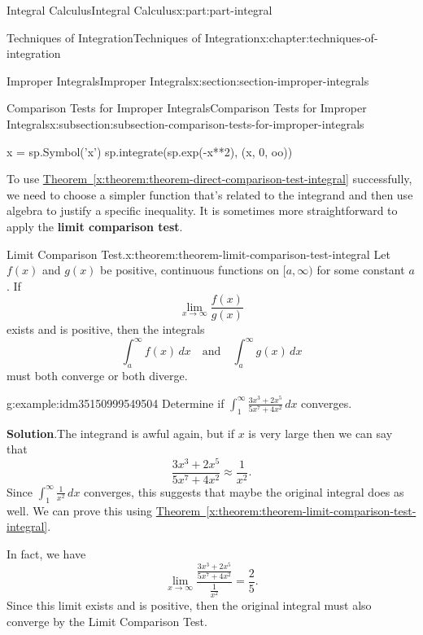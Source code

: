 \documentclass[twoside,10pt,]{tufte-book}
\newcommand{\blocktitlefont}{\relax}
\newcommand{\xreffont}{\relax}
\newcommand{\terminology}[1]{\textbf{#1}}
\numberwithin{equation}{part}
\begin{document}
\begin{partptx}{Integral Calculus}{}{Integral Calculus}{}{}{x:part:part-integral}
\begin{chapterptx}{Techniques of Integration}{}{Techniques of Integration}{}{}{x:chapter:techniques-of-integration}
\begin{sectionptx}{Improper Integrals}{}{Improper Integrals}{}{}{x:section:section-improper-integrals}
\begin{subsectionptx}{Comparison Tests for Improper Integrals}{}{Comparison Tests for Improper Integrals}{}{}{x:subsection:subsection-comparison-tests-for-improper-integrals}
\begin{sageinput}
x = sp.Symbol('x')
sp.integrate(sp.exp(-x**2), (x, 0, oo))
\end{sageinput}
To use \hyperref[x:theorem:theorem-direct-comparison-test-integral]{Theorem~{\xreffont\ref{x:theorem:theorem-direct-comparison-test-integral}}} successfully, we need to choose a simpler function that's related to the integrand and then use algebra to justify a specific inequality. It is sometimes more straightforward to apply the \terminology{limit comparison test}.%
\begin{theorem}{Limit Comparison Test.}{}{x:theorem:theorem-limit-comparison-test-integral}%
%
Let \(f(x)\) and \(g(x)\) be positive, continuous functions on \([a,\infty)\) for some constant \(a\). If%
\begin{equation*}
\lim_{x\to\infty}\frac{f(x)}{g(x)}
\end{equation*}
exists and is positive, then the integrals%
\begin{equation*}
\int_{a}^{\infty}f(x)\,dx\quad\text{and}\quad\int_{a}^{\infty}g(x)\,dx
\end{equation*}
must both converge or both diverge.%
\end{theorem}
\begin{example}{}{g:example:idm35150999549504}%
Determine if \(\displaystyle\int_{1}^{\infty}\frac{3x^{3} + 2x^{5}}{5x^{7} + 4x^{2}}\,dx\) converges.%
\par\smallskip%
\noindent\textbf{\blocktitlefont Solution}.\hypertarget{g:solution:idm35150999548608}{}\quad{}The integrand is awful again, but if \(x\) is very large then we can say that%
\begin{equation*}
\frac{3x^{3} + 2x^{5}}{5x^{7} + 4x^{2}} \approx \frac{1}{x^{2}}.
\end{equation*}
Since \(\int_{1}^{\infty}\frac{1}{x^{2}}\,dx\) converges, this suggests that maybe the original integral does as well. We can prove this using \hyperref[x:theorem:theorem-limit-comparison-test-integral]{Theorem~{\xreffont\ref{x:theorem:theorem-limit-comparison-test-integral}}}.%
\par
In fact, we have%
\begin{equation*}
\lim_{x\to\infty}\frac{\frac{3x^{3} + 2x^{5}}{5x^{7} + 4x^{2}}}{\frac{1}{x^{2}}} = \frac{2}{5}.
\end{equation*}
Since this limit exists and is positive, then the original integral must also converge by the Limit Comparison Test.%
\end{example}
\end{subsectionptx}

\end{sectionptx}
\end{chapterptx}
\end{partptx}
\end{document}
